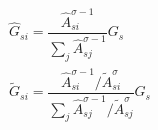 \begin{gather*}\label{eq:allocation_social_planner_G}
    \hat{G}_{si} = \dfrac{\hat{A}_{si}^{\sigma -1}}{\sum_j \hat{A}_{sj}^{\sigma -1}}G_s\\ 
    \tilde{G}_{si} = \dfrac{\hat{A}_{si}^{\sigma -1}/\tilde{A}_{si}^{\sigma}}{\sum_j \hat{A}_{sj}^{\sigma -1}/ \tilde{A}_{sj}^{\sigma}}G_s
\end{gather*}